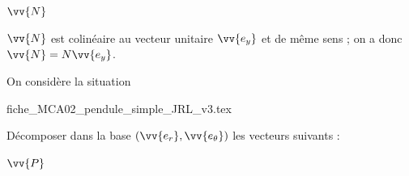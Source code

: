 \begin{enonce}
	$\vv{N}$
\end{enonce}


\begin{corrige}
$\vv{N}$ est colinéaire au vecteur unitaire $\vv{e_y}$ et de même sens ; on a donc $\vv{N} = N \vv{e_y}$.
\end{corrige}

\finEntrainement





\newpage




\hauteurLargeurCadreReponse		{7mm}{4.75cm}
\initialisationEntrainement


On considère la situation 
\begin{center}
{fiche_MCA02_pendule_simple_JRL_v3.tex}
\end{center}

Décomposer dans la base $(\vv{e_r}, \vv{e_\theta})$ les vecteurs suivants : 

\debutEntrainement

\begin{enonce}
	$\vv{P}$
\end{enonce}

